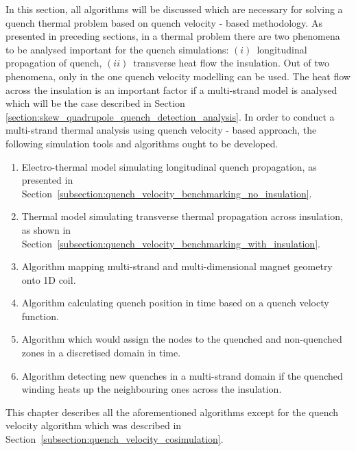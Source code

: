 
In this section, all algorithms will be discussed which are necessary for solving a quench thermal problem based on quench velocity - based methodology. As presented in preceding sections, in a thermal problem there are two phenomena to be analysed important for the quench simulations: $(i)$~longitudinal propagation of quench, $(ii)$~transverse heat flow the insulation. Out of two phenomena, only in the  one quench velocity modelling can be used. The heat flow across the insulation is an important factor if a multi-strand model is analysed which will be the case described in Section \ref{section:skew_quadrupole_quench_detection_analysis}. In order to conduct a multi-strand thermal analysis using quench velocity - based approach, the following simulation tools and algorithms ought to be developed.

\begin{enumerate}
\item Electro-thermal model simulating longitudinal quench propagation, as presented in Section~\ref{subsection:quench_velocity_benchmarking_no_insulation}.
\item Thermal model simulating transverse thermal propagation across insulation, as shown in Section~\ref{subsection:quench_velocity_benchmarking_with_insulation}.
\item Algorithm mapping multi-strand and multi-dimensional magnet geometry onto 1D coil.
\item Algorithm calculating quench position in time based on a quench velocty function.
\item Algorithm which would assign the nodes to the quenched and non-quenched zones in a discretised domain in time.
\item Algorithm detecting new quenches in a multi-strand domain if the quenched winding heats up the neighbouring ones across the insulation.
\end{enumerate}

This chapter describes all the aforementioned algorithms except for the quench velocity algorithm which was described in Section~\ref{subsection:quench_velocity_cosimulation}.